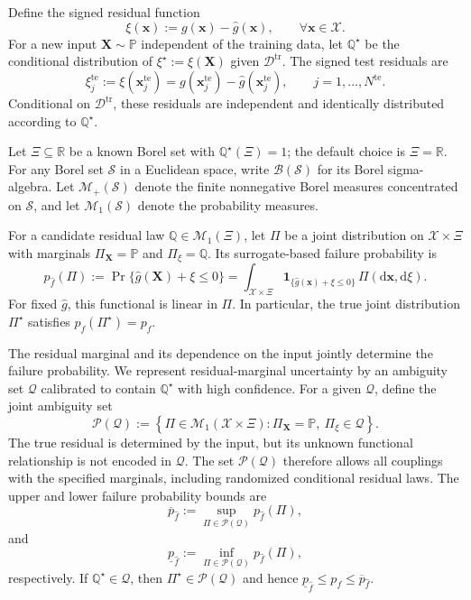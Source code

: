 \documentclass[review,11pt,3p,authoryear,nopreprintline]{elsarticle}
\begin{document}
Define the signed residual function
\[
  \xi(\bm x):=g(\bm x)-\hat g(\bm x),\qquad \forall \bm x\in\mathcal X.
\]
For a new input $\bm X\sim\mathbb P$ independent of the training data, let $\mathbb Q^\star$ be the conditional distribution of $\xi^\star:=\xi(\bm X)$ given $\mathcal D^{\mathrm{tr}}$. The signed test residuals are
\[
  \xi_j^{\mathrm{te}}:=\xi(\bm x_j^{\mathrm{te}})=g(\bm x_j^{\mathrm{te}})-\hat g(\bm x_j^{\mathrm{te}}),\qquad j=1,\ldots,N^{\mathrm{te}}.
\]
Conditional on $\mathcal D^{\mathrm{tr}}$, these residuals are independent and identically distributed according to $\mathbb Q^\star$.

Let $\Xi\subseteq\mathbb R$ be a known Borel set with $\mathbb Q^\star(\Xi)=1$; the default choice is $\Xi=\mathbb R$. For any Borel set $\mathcal S$ in a Euclidean space, write $\mathcal B(\mathcal S)$ for its Borel sigma-algebra. Let $\mathcal M_+(\mathcal S)$ denote the finite nonnegative Borel measures concentrated on $\mathcal S$, and let $\mathcal M_1(\mathcal S)$ denote the probability measures.

For a candidate residual law $\mathbb Q\in\mathcal M_1(\Xi)$, let $\Pi$ be a joint distribution on $\mathcal X\times\Xi$ with marginals $\Pi_{\bm X}=\mathbb P$ and $\Pi_\xi=\mathbb Q$. Its surrogate-based failure probability is
\begin{equation}
  p_{\hat f}(\Pi):=\Pr\{\hat g(\bm X)+\xi\le0\}=\int_{\mathcal X\times\Xi}\mathbf 1_{\{\hat g(\bm x)+\xi\le0\}}\,\Pi(\mathrm d\bm x,\mathrm d\xi).
  \label{eq-surrogate-failure-probability}
\end{equation}
For fixed $\hat g$, this functional is linear in $\Pi$. In particular, the true joint distribution $\Pi^\star$ satisfies $p_{\hat f}(\Pi^\star)=p_f$.

The residual marginal and its dependence on the input jointly determine the failure probability. We represent residual-marginal uncertainty by an ambiguity set $\mathcal Q$ calibrated to contain $\mathbb Q^\star$ with high confidence. For a given $\mathcal Q$, define the joint ambiguity set
\[
  \mathcal P(\mathcal Q) :=\left\{\Pi\in\mathcal M_1(\mathcal X\times\Xi):\Pi_{\bm X}=\mathbb P,\ \Pi_\xi\in\mathcal Q\right\}.
\]
The true residual is determined by the input, but its unknown functional relationship is not encoded in $\mathcal Q$. The set $\mathcal P(\mathcal Q)$ therefore allows all couplings with the specified marginals, including randomized conditional residual laws. The upper and lower failure probability bounds are
\begin{equation}
  \overline p_{\hat f}:=\sup_{\Pi\in\mathcal P(\mathcal Q)}p_{\hat f}(\Pi),
  \label{eq-upper-bound}
\end{equation}
and
\begin{equation}
  \underline p_{\hat f}:=\inf_{\Pi\in\mathcal P(\mathcal Q)}p_{\hat f}(\Pi),
  \label{eq-lower-bound}
\end{equation}
respectively. If $\mathbb Q^\star\in\mathcal Q$, then $\Pi^\star\in\mathcal P(\mathcal Q)$ and hence $\underline p_{\hat f}\le p_f\le\overline p_{\hat f}$.
\end{document}
